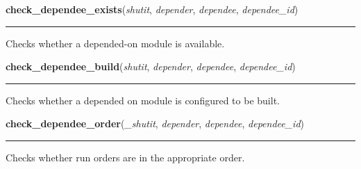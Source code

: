    \label{shutit_main:check_dependee_exists}

    \vspace{0.5ex}

\hspace{.8\funcindent}\begin{boxedminipage}{\funcwidth}

    \raggedright \textbf{check\_dependee\_exists}(\textit{shutit}, \textit{depender}, \textit{dependee}, \textit{dependee\_id})

    \vspace{-1.5ex}

    \rule{\textwidth}{0.5\fboxrule}
\setlength{\parskip}{2ex}
    Checks whether a depended-on module is available.

\setlength{\parskip}{1ex}
    \end{boxedminipage}

    \label{shutit_main:check_dependee_build}

    \vspace{0.5ex}

\hspace{.8\funcindent}\begin{boxedminipage}{\funcwidth}

    \raggedright \textbf{check\_dependee\_build}(\textit{shutit}, \textit{depender}, \textit{dependee}, \textit{dependee\_id})

    \vspace{-1.5ex}

    \rule{\textwidth}{0.5\fboxrule}
\setlength{\parskip}{2ex}
    Checks whether a depended on module is configured to be built.

\setlength{\parskip}{1ex}
    \end{boxedminipage}

    \label{shutit_main:check_dependee_order}

    \vspace{0.5ex}

\hspace{.8\funcindent}\begin{boxedminipage}{\funcwidth}

    \raggedright \textbf{check\_dependee\_order}(\textit{\_shutit}, \textit{depender}, \textit{dependee}, \textit{dependee\_id})

    \vspace{-1.5ex}

    \rule{\textwidth}{0.5\fboxrule}
\setlength{\parskip}{2ex}
    Checks whether run orders are in the appropriate order.

\setlength{\parskip}{1ex}
    \end{boxedminipage}

